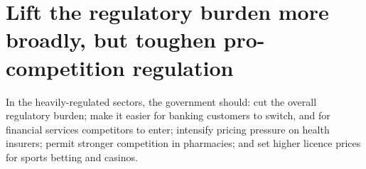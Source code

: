 \section {Lift the regulatory burden more broadly, but toughen pro-competition regulation}


In the heavily-regulated sectors, the government should: cut the overall regulatory burden; make it easier for banking customers to switch, and for financial services competitors to enter; intensify pricing pressure on health insurers; permit stronger competition in pharmacies; and set higher licence prices for sports betting and casinos. 

